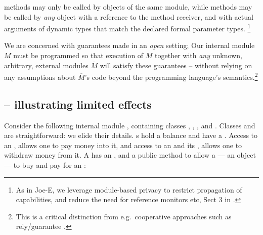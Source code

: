 { methods  {may only be} called by objects of the same
  module,  while   methods  may be {{called} by \emph{any}
  object with a reference to the method receiver, {and with
  actual arguments of  dynamic types that match} the declared formal parameter types.}%
\!\footnote{As in Joe-E, we leverage  module-based privacy to restrict propagation of capabilities, and reduce the need for reference monitors etc, \cf Sect 3 in  \cite{JoeE}.}   

\label{s:concepts}
 
We are concerned with guarantees made in an \emph{open} setting; %
Our internal module
$M$ must be programmed so that 
  execution of $M$  together with \emph{any} unknown, arbitrary, external modules $\overline M$
will satisfy these guarantees --
without relying on any assumptions about $\overline M$'s code
beyond the programming language's semantics.\!\footnote{This is a critical distinction from e.g.\
cooperative approaches such as rely/guarantee
\cite{relyGuarantee-HayesJones-setss2017,relyGuarantee-vanStaden-mpc2015}.}
  
 

\subsection*{ -- illustrating limited effects}  
\label{sec:how}
\label{sec:shop}

Consider the following internal module \Mshop, %
containing classes , \prg{Shop}, \prg{Account}, and . 
Classes \prg{Inventory} and \prg{Item} are straightforward: we elide
their details. 
s hold a balance and have a \password. 
Access to an ,  allows one  to pay money into it, 
and  access to an \prg{Account}  and its , allows one to withdraw money from it.
A  has an ,
and a public method  to allow a 
 --- an    object --- to buy
and pay for an :
 
}
